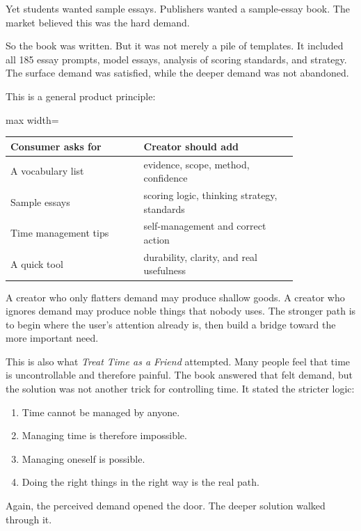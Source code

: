 Yet students wanted sample essays. Publishers wanted a sample-essay book. The market believed this was the hard demand.

So the book was written. But it was not merely a pile of templates. It included all 185 essay prompts, model essays, analysis of scoring standards, and strategy. The surface demand was satisfied, while the deeper demand was not abandoned.

This is a general product principle:

\begin{center}
\begin{adjustbox}{max width=\linewidth}
\begin{tabular}{p{0.38\linewidth}p{0.44\linewidth}}
\hline
Consumer asks for & Creator should add \\
\hline
A vocabulary list & evidence, scope, method, confidence \\
Sample essays & scoring logic, thinking strategy, standards \\
Time management tips & self-management and correct action \\
A quick tool & durability, clarity, and real usefulness \\
\hline
\end{tabular}
\end{adjustbox}
\end{center}

A creator who only flatters demand may produce shallow goods. A creator who ignores demand may produce noble things that nobody uses. The stronger path is to begin where the user's attention already is, then build a bridge toward the more important need.

This is also what \emph{Treat Time as a Friend} attempted. Many people feel that time is uncontrollable and therefore painful. The book answered that felt demand, but the solution was not another trick for controlling time. It stated the stricter logic:

\begin{enumerate}
\item Time cannot be managed by anyone.
\item Managing time is therefore impossible.
\item Managing oneself is possible.
\item Doing the right things in the right way is the real path.
\end{enumerate}

Again, the perceived demand opened the door. The deeper solution walked through it.

